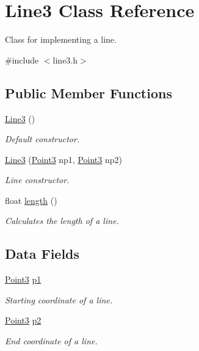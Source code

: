 \hypertarget{class_line3}{}\section{Line3 Class Reference}
\label{class_line3}


Class for implementing a line.  




{\ttfamily \#include $<$line3.\+h$>$}

\subsection*{Public Member Functions}
\begin{DoxyCompactItemize}
\item 
\mbox{\hyperlink{class_line3_aa137ee7a270002e5d601df5d5a370c7f}{Line3}} ()
\begin{DoxyCompactList}\small\item\em Default constructor. \end{DoxyCompactList}\item 
\mbox{\hyperlink{class_line3_a2eedc060f2b071305bfb30a087c528bf}{Line3}} (\mbox{\hyperlink{class_point3}{Point3}} np1, \mbox{\hyperlink{class_point3}{Point3}} np2)
\begin{DoxyCompactList}\small\item\em Line constructor. \end{DoxyCompactList}\item 
float \mbox{\hyperlink{class_line3_a8b8113b527728d0d8ba9b4cdcd09da32}{length}} ()
\begin{DoxyCompactList}\small\item\em Calculates the length of a line. \end{DoxyCompactList}\end{DoxyCompactItemize}
\subsection*{Data Fields}
\begin{DoxyCompactItemize}
\item 
\mbox{\hyperlink{class_point3}{Point3}} \mbox{\hyperlink{class_line3_a3847fbeaf089c44637e2e52c0ef1ea5a}{p1}}
\begin{DoxyCompactList}\small\item\em Starting coordinate of a line. \end{DoxyCompactList}\item 
\mbox{\hyperlink{class_point3}{Point3}} \mbox{\hyperlink{class_line3_a4b75271d054d200148a5d0ddb2ca1795}{p2}}
\begin{DoxyCompactList}\small\item\em End coordinate of a line. \end{DoxyCompactList}\end{DoxyCompactItemize}
